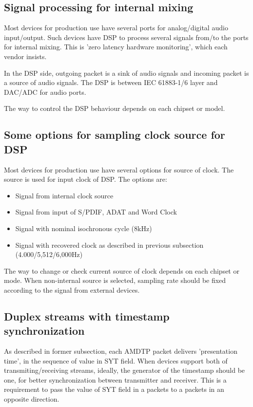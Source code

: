 \documentclass[onecolumn]{article}
\begin{document}
\subsection{Signal processing for internal mixing}
\label{sec:internal-mixing}

Most devices for production use have several ports for analog/digital audio input/output. Such devices have DSP to process several signals from/to the ports for internal mixing. This is 'zero latency hardware monitoring', which each vendor insists.

In the DSP side, outgoing packet is a sink of audio signals and incoming packet is a source of audio signals. The DSP is between IEC 61883-1/6 layer and DAC/ADC for audio ports.

The way to control the DSP behaviour depends on each chipset or model.

\subsection{Some options for sampling clock source for DSP}

Most devices for production use have several options for source of clock. The source is used for input clock of DSP. The options are:
\begin{itemize}
	\item Signal from internal clock source
	\item Signal from input of S/PDIF, ADAT and Word Clock
	\item Signal with nominal isochronous cycle (8kHz)
	\item Signal with recovered clock as described in previous subsection (4.000/5,512/6,000Hz)
\end{itemize}

The way to change or check current source of clock depends on each chipset or mode. When non-internal source is selected, sampling rate should be fixed according to the signal from external devices.

\subsection{Duplex streams with timestamp synchronization}
\label{sec:duplex-streams}

As described in former subsection, each AMDTP packet delivers 'presentation time', in the sequence of value in SYT field. When devices support both of transmiting/receiving streams, ideally, the generator of the timestamp should be one, for better synchronization between transmitter and receiver. This is a requirement to pass the value of SYT field in a packets to a packets in an opposite direction.
\end{document}

